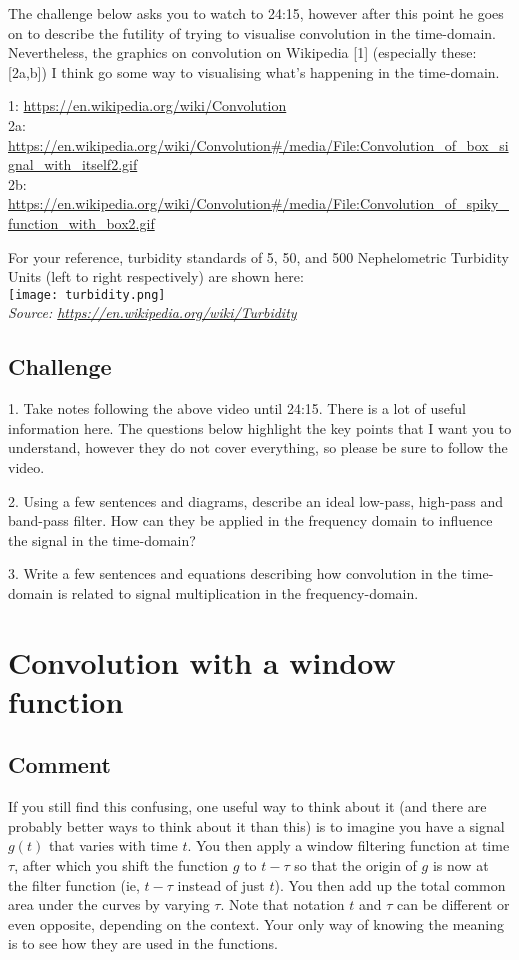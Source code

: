 The challenge below asks you to watch to 24:15, however after this point he goes on to describe the futility of trying to visualise convolution in the time-domain. Nevertheless, the graphics on convolution on Wikipedia [1] (especially these: [2a,b]) I think go some way to visualising what's happening in the time-domain.

1: \url{https://en.wikipedia.org/wiki/Convolution}\\
2a: \url{https://en.wikipedia.org/wiki/Convolution\#/media/File:Convolution_of_box_signal_with_itself2.gif}\\
2b: \url{https://en.wikipedia.org/wiki/Convolution\#/media/File:Convolution_of_spiky_function_with_box2.gif}

For your reference, turbidity standards of 5, 50, and 500 Nephelometric Turbidity Units (left to right respectively) are shown here:\\
\texttt{[image: turbidity.png]}\\
\emph{Source: \url{https://en.wikipedia.org/wiki/Turbidity}}

\subsection*{Challenge}
1. Take notes following the above video until 24:15. There is a lot of useful information here. The questions below highlight the key points that I want you to understand, however they do not cover everything, so please be sure to follow the video.

2. Using a few sentences and diagrams, describe an ideal low-pass, high-pass and band-pass filter. How can they be applied in the frequency domain to influence the signal in the time-domain?

3. Write a few sentences and equations describing how convolution in the time-domain is related to signal multiplication in the frequency-domain.

\timebox



\iffalse
\newpage
\section{Convolution with a window function}

\subsection*{Comment}
If you still find this confusing, one useful way to think about it (and there are probably better ways to think about it than this) is to imagine you have a signal $g(t)$ that varies with time $t$. You then apply a window filtering function at time $\tau$, after which you shift the function $g$ to $t-\tau$ so that the origin of $g$ is now at the filter function (ie, $t-\tau$ instead of just $t$). You then add up the total common area under the curves by varying $\tau$. Note that notation $t$ and $\tau$ can be different or even opposite, depending on the context. Your only way of knowing the meaning is to see how they are used in the functions.

